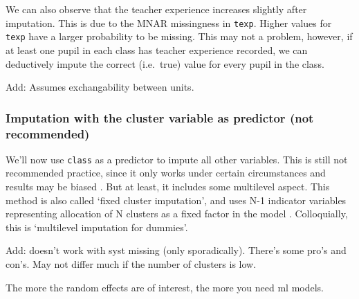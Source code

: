 \documentclass[
]{jss}
\begin{document}
We can also observe that the teacher experience increases slightly after
imputation. This is due to the MNAR missingness in \texttt{texp}. Higher
values for \texttt{texp} have a larger probability to be missing. This
may not a problem, however, if at least one pupil in each class has
teacher experience recorded, we can deductively impute the correct
(i.e.~true) value for every pupil in the class.

Add: Assumes exchangability between units.

\hypertarget{imputation-with-the-cluster-variable-as-predictor-not-recommended}{%
\subsubsection{Imputation with the cluster variable as predictor (not
recommended)}\label{imputation-with-the-cluster-variable-as-predictor-not-recommended}}

We'll now use \texttt{class} as a predictor to impute all other
variables. This is still not recommended practice, since it only works
under certain circumstances and results may be biased
\citep{drec15, ende16}. But at least, it includes some multilevel
aspect. This method is also called `fixed cluster imputation', and uses
N-1 indicator variables representing allocation of N clusters as a fixed
factor in the model \citep{reit06, ende2016}. Colloquially, this is
`multilevel imputation for dummies'.

Add: doesn't work with syst missing (only sporadically). There's some
pro's and con's. May not differ much if the number of clusters is low.

The more the random effects are of interest, the more you need ml
models.

\begin{CodeChunk}
\end{CodeChunk}
\end{document}
